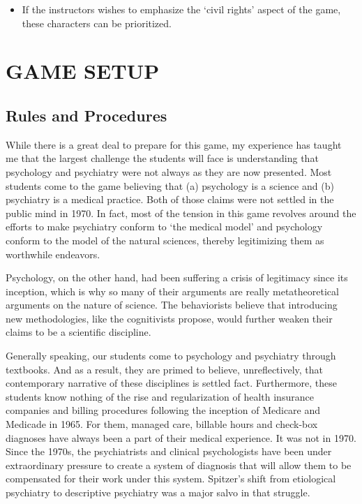 \begin{itemize}
\item If the instructors wishes to emphasize the `civil rights' aspect of the game, these characters can be prioritized.

\end{itemize}

\pagebreak 

\chapter{GAME SETUP}
\label{gamesetup}

\section{Rules and Procedures}
\label{rulesandprocedures}

While there is a great deal to prepare for this game, my experience has taught me that the largest challenge the students will face is understanding that psychology and psychiatry were not always as they are now presented. Most students come to the game believing that (a) psychology is a science and (b) psychiatry is a medical practice. Both of those claims were not settled in the public mind in 1970. In fact, most of the tension in this game revolves around the efforts to make psychiatry conform to `the medical model' and psychology conform to the model of the natural sciences, thereby legitimizing them as worthwhile endeavors.

Psychology, on the other hand, had been suffering a crisis of legitimacy since its inception, which is why so many of their arguments are really metatheoretical arguments on the nature of science. The behaviorists believe that introducing new methodologies, like the cognitivists propose, would further weaken their claims to be a scientific discipline. 

Generally speaking, our students come to psychology and psychiatry through textbooks. And as a result, they are primed to believe, unreflectively, that contemporary narrative of these disciplines is settled fact. Furthermore, these students know nothing of the rise and regularization of health insurance companies and billing procedures following the inception of Medicare and Medicade in 1965. For them, managed care, billable hours and check-box diagnoses have always been a part of their medical experience. It was not in 1970. Since the 1970s, the psychiatrists and clinical psychologists have been under extraordinary pressure to create a system of diagnosis that will allow them to be compensated for their work under this system. Spitzer's shift from etiological psychiatry to descriptive psychiatry was a major salvo in that struggle. 

